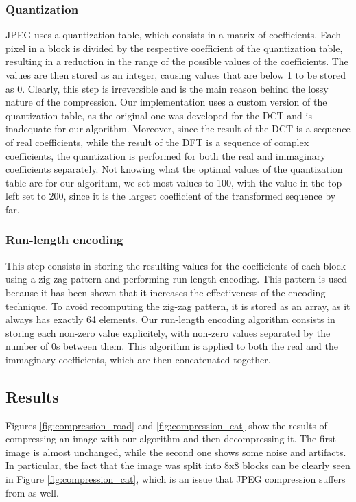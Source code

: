 \subsubsection{Quantization}
JPEG uses a quantization table, which consists in a matrix of coefficients. Each pixel in a block is divided by the respective coefficient of the quantization table, resulting in a reduction in the range of the possible values of the coefficients. The values are then stored as an integer, causing values that are below 1 to be stored as 0. Clearly, this step is irreversible and is the main reason behind the lossy nature of the compression. Our implementation uses a custom version of the quantization table, as the original one was developed for the DCT and is inadequate for our algorithm. Moreover, since the result of the DCT is a sequence of real coefficients, while the result of the DFT is a sequence of complex coefficients, the quantization is performed for both the real and immaginary coefficients separately. Not knowing what the optimal values of the quantization table are for our algorithm, we set most values to 100, with the value in the top left set to 200, since it is the largest coefficient of the transformed sequence by far.

\subsubsection{Run-length encoding}
This step consists in storing the resulting values for the coefficients of each block using a zig-zag pattern and performing run-length encoding. This pattern is used because it has been shown that it increases the effectiveness of the encoding technique. To avoid recomputing the zig-zag pattern, it is stored as an array, as it always has exactly 64 elements. Our run-length encoding algorithm consists in storing each non-zero value explicitely, with non-zero values separated by the number of 0s between them. This algorithm is applied to both the real and the immaginary coefficients, which are then concatenated together.

\subsection{Results}
Figures \ref{fig:compression_road} and \ref{fig:compression_cat} show the results of compressing an image with our algorithm and then decompressing it. The first image is almost unchanged, while the second one shows some noise and artifacts. In particular, the fact that the image was split into 8x8 blocks can be clearly seen in Figure \ref{fig:compression_cat}, which is an issue that JPEG compression suffers from as well. 


